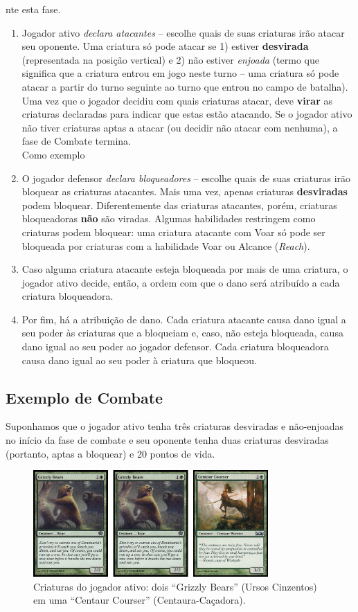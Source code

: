 nte esta fase.

\begin{enumerate}
  \item Jogador ativo \textit{declara atacantes} -- escolhe
quais de suas criaturas irão atacar seu oponente. Uma criatura só pode atacar se 1) estiver \textbf{desvirada} (representada na posição vertical) e 2) não estiver \textit{enjoada} (termo que significa que a criatura entrou em jogo neste turno -- uma criatura só pode atacar a partir do turno seguinte ao turno que entrou no campo de batalha). Uma vez que o jogador decidiu com quais criaturas atacar, deve \textbf{virar} as criaturas declaradas para indicar que estas estão atacando. Se o jogador ativo não tiver criaturas aptas a atacar (ou decidir não atacar com nenhuma), a fase de Combate termina.
\\ Como exemplo
    \item O jogador defensor \textit{declara bloqueadores} -- escolhe quais de suas criaturas irão
bloquear as criaturas atacantes. Mais uma vez, apenas criaturas \textbf{desviradas} podem bloquear. Diferentemente das criaturas atacantes, porém, criaturas bloqueadoras \textbf{não} são viradas. Algumas habilidades restringem como criaturas podem bloquear: uma criatura atacante com Voar só pode ser bloqueada por criaturas com a habilidade Voar ou Alcance (\textit{Reach}).
    \item Caso alguma criatura atacante esteja bloqueada
por mais de uma criatura, o jogador ativo decide, então, a ordem com que o dano será
atribuído a cada criatura bloqueadora.
    \item Por fim, há a atribuição de dano. Cada criatura atacante causa dano igual a seu poder às criaturas que a bloqueiam e, caso, não esteja bloqueada, causa dano igual ao seu poder ao jogador defensor. Cada criatura bloqueadora causa dano igual ao seu poder à criatura que bloqueou.
\end{enumerate}

\subsection{Exemplo de Combate}

Suponhamos que o jogador ativo tenha três criaturas desviradas e não-enjoadas no início da fase de combate e seu oponente tenha duas criaturas desviradas (portanto, aptas a bloquear) e 20 pontos de vida.

\begin{figure}[!h]
  \centering
  \includegraphics[width=0.8\textwidth]{picstcc/att1.png}
  \caption{Criaturas do jogador ativo: dois ``Grizzly Bears'' (Ursos Cinzentos) em uma ``Centaur Courser'' (Centaura-Caçadora).}
  \label{beginattack}
\end{figure}

